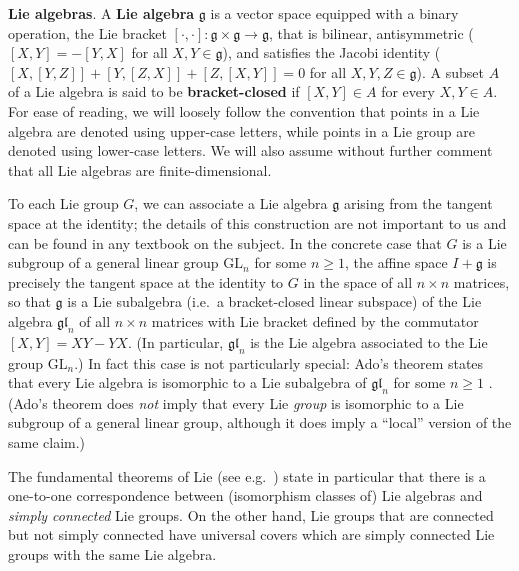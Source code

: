 \documentclass[11pt]{article}
\numberwithin{equation}{section}
\theoremstyle{plain}
\theoremstyle{definition}
\theoremstyle{remark}
\numberwithin{equation}{section}
\numberwithin{equation}{section}
\begin{document}
\medskip

\textbf{Lie algebras}. A \textbf{Lie algebra} $\mathfrak{g}$ is a vector space equipped with a binary operation, the Lie bracket $[\cdot, \cdot]: \mathfrak{g} \times \mathfrak{g} \rightarrow \mathfrak{g}$, that is bilinear, antisymmetric ($[X, Y] = -[Y, X]$ for all $X, Y \in \mathfrak{g}$), and satisfies the Jacobi identity ($[X, [Y, Z]] + [Y, [Z, X]] + [Z, [X, Y]] = 0$ for all $X, Y, Z \in \mathfrak{g}$). A subset $A$ of a Lie algebra is said to be \textbf{bracket-closed} if $[X,Y]\in A$ for every $X,Y\in A$.
For ease of reading, we will loosely follow the convention that points in a Lie algebra are denoted using upper-case letters, while points in a Lie group are denoted using lower-case letters. We will also assume without further comment that all Lie algebras are finite-dimensional. 

\medskip

To each Lie group $G$, we can associate a Lie algebra $\mathfrak{g}$ arising from the tangent space at the identity; the details of this construction are not important to us and can be found in any textbook on the subject. In the concrete case that $G$ is a Lie subgroup of a general linear group $\mathrm{GL}_n$ for some $n\geq 1$, the affine space
%
  $I+\mathfrak{g}$ is precisely the tangent space at the identity to $G$ in the space of all $n\times n$ matrices, so that $\mathfrak{g}$ is a Lie subalgebra (i.e.\ a bracket-closed linear subspace) of the Lie algebra $\mathfrak{gl}_n$ of all $n\times n$ matrices with Lie bracket defined by the commutator $[X,Y]=XY-YX$. (In particular, $\mathfrak{gl}_n$ is the Lie algebra associated to the Lie group $\mathrm{GL}_n$.)
%
%
%
%
In fact this case is not particularly special:
Ado's theorem states that every Lie algebra is isomorphic to a Lie subalgebra  of $\mathfrak{gl}_n$ for some $n\geq 1$ \cite[Chapter 2.3]{MR3237440}. (Ado's theorem does \emph{not} imply that every Lie \emph{group} is isomorphic to a Lie subgroup of a general linear group, although it does imply a ``local'' version of the same claim.)

\medskip

The fundamental theorems of Lie (see e.g.\ \cite[Chapter 2.5.1]{MR3237440}) state in particular that there is a one-to-one correspondence between (isomorphism classes of) Lie algebras and \emph{simply connected} Lie groups. On the other hand, Lie groups that are connected but not simply connected have universal covers which are simply connected Lie groups with the same Lie algebra. 
\end{document}
